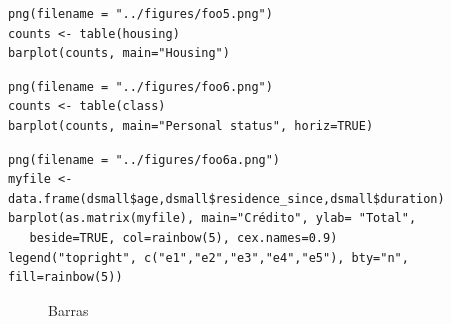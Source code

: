 \begin{verbatim}
png(filename = "../figures/foo5.png")
counts <- table(housing)
barplot(counts, main="Housing") 
\end{verbatim}

\begin{verbatim}
png(filename = "../figures/foo6.png")
counts <- table(class)
barplot(counts, main="Personal status", horiz=TRUE)
\end{verbatim}

\begin{verbatim}
png(filename = "../figures/foo6a.png")
myfile <- data.frame(dsmall$age,dsmall$residence_since,dsmall$duration)
barplot(as.matrix(myfile), main="Crédito", ylab= "Total",
   beside=TRUE, col=rainbow(5), cex.names=0.9)
legend("topright", c("e1","e2","e3","e4","e5"), bty="n", fill=rainbow(5))
\end{verbatim}

\begin{figure}[h]
 \begin{center}
 \hspace{0.1cm}
 \hspace{0.1cm}
 \caption{Barras}
 \label{fig:barras}
 \end{center}
\end{figure}

